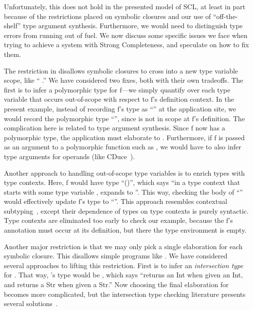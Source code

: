 Unfortunately, this does not hold in the presented model of SCL, at least in part because of the restrictions placed on
symbolic closures and our use of ``off-the-shelf'' type argument synthesis.
Furthermore, we would need to distinguish type errors from running out of fuel.
We now discuss some specific issues we face when trying to achieve a system with Strong Completeness,
and speculate on how to fix them.

The restriction in \ltiSCAbs disallows symbolic closures to cross into a new type variable
scope, like
``
       {}.''
We have considered two fixes, both with their own tradeoffs.
The first is to infer a polymorphic type for $\text{f}$---we simply quantify
over each type variable that occurs out-of-scope with respect to $\text{f}$'s
definition context.
In the present example, instead of recording $\text{f}$'s type as
``'' at the application site,
we would record the polymorphic type
``'',
since {\ltitvar{}} is not in scope at $\text{f}$'s definition.
The complication here is related to type argument synthesis.
Since $\text{f}$ now has a polymorphic type, 
the application must elaborate to .
Furthermore, if $\text{f}$ is passed as an argument to a polymorphic function
such as ,
we would have to also infer type arguments for operands
(like CDuce~\cite{polyduce2}).

Another approach to handling out-of-scope type variables is to 
enrich types with type contexts.
Here, $\text{f}$ would have type 
``()'',
which says ``in a type context that starts with some
type variable \ltitvar{},
expands to ''.
This way, checking the body of ``''
would effectively update $\text{f}$'s type to 
``''.
This approach resembles contextual subtyping~\cite{Dunfield2004Tridirectional},
except their dependence of types on type contexts is purely syntactic.
Type contexts are eliminated too early to check our example,
because the $\text{f}$'s annotation must occur at its definition, but
there the type environment is empty.

Another major restriction is that we may only pick a single
elaboration for each symbolic closure. This disallows simple programs like 
       {}.
We have considered several approaches to lifting this restriction.
First is to infer an \emph{intersection type} for .
That way, 's type would be
,
which says ``returns an Int when given an Int, and returns a Str
when given a Str.''
Now choosing the final elaboration for {\ltiE{}} becomes more complicated,
but the intersection type checking literature presents several solutions~\cite{wells2002branching,Dunfield2004Tridirectional,polyduce1}.

